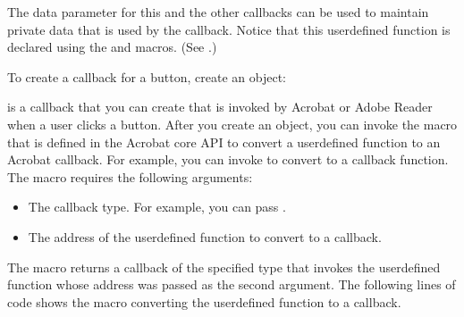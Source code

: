 \documentclass[letterpaper,12pt,english,openany,oneside]{sphinxmanual}
\begin{document}
\begin{sphinxVerbatim}[commandchars=\\\{\}]
     
      
\end{sphinxVerbatim}

The data parameter for this and the other callbacks can be used to maintain private data that is used by the callback. Notice that this user\sphinxhyphen{}defined function is declared using the  and  macros. (See .)

To create a callback for a button, create an  object:

\begin{sphinxVerbatim}[commandchars=\\\{\}]
   
\end{sphinxVerbatim}

 is a callback that you can create that is invoked by Acrobat or Adobe Reader when a user clicks a button. After you create an  object, you can invoke the  macro that is defined in the Acrobat core API to convert a user\sphinxhyphen{}defined function to an Acrobat callback. For example, you can invoke  to convert  to a callback function. The  macro requires the following arguments:
\begin{itemize}
\item {} 
The callback type. For example, you can pass .

\item {} 
The address of the user\sphinxhyphen{}defined function to convert to a callback.

\end{itemize}

The  macro returns a callback of the specified type that invokes the user\sphinxhyphen{}defined function whose address was passed as the second argument. The following lines of code shows the  macro converting the  user\sphinxhyphen{}defined function to a  callback.
\end{document}
